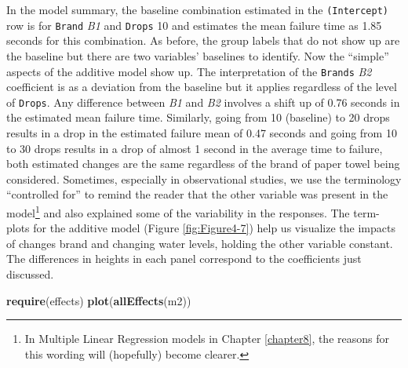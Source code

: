 \documentclass[]{book}
\newenvironment{Shaded}{\begin{snugshade}}{\end{snugshade}}
\newcommand{\KeywordTok}[1]{\textcolor[rgb]{0.13,0.29,0.53}{\textbf{#1}}}
\newcommand{\NormalTok}[1]{#1}
\let\rmarkdownfootnote\footnote%
\def\footnote{\protect\rmarkdownfootnote}
\theoremstyle{definition}
\theoremstyle{definition}
\theoremstyle{remark}
\begin{document}
In the model summary, the baseline combination estimated in the
\texttt{(Intercept)} row is for \texttt{Brand} \emph{B1} and
\texttt{Drops} 10 and estimates the mean failure time as 1.85 seconds
for this combination. As before, the group labels that do not show up
are the baseline but there are two variables' baselines to identify. Now
the ``simple'' aspects of the additive model show up. The interpretation
of the \texttt{Brands} \emph{B2} coefficient is as a deviation from the
baseline but it applies regardless of the level of \texttt{Drops}. Any
difference between \emph{B1} and \emph{B2} involves a shift up of 0.76
seconds in the estimated mean failure time. Similarly, going from 10
(baseline) to 20 drops results in a drop in the estimated failure mean
of 0.47 seconds and going from 10 to 30 drops results in a drop of
almost 1 second in the average time to failure, both estimated changes
are the same regardless of the brand of paper towel being considered.
Sometimes, especially in observational studies, we use the terminology
``controlled for'' to remind the reader that the other variable was
present in the model\footnote{In Multiple Linear Regression models in
  Chapter \ref{chapter8}, the reasons for this wording will (hopefully)
  become clearer.} and also explained some of the variability in the
responses. The term-plots for the additive model (Figure
\ref{fig:Figure4-7}) help us visualize the impacts of changes brand and
changing water levels, holding the other variable constant. The
differences in heights in each panel correspond to the coefficients just
discussed.





\begin{Shaded}
\begin{Highlighting}[]
\KeywordTok{require}\NormalTok{(effects)}
\KeywordTok{plot}\NormalTok{(}\KeywordTok{allEffects}\NormalTok{(m2))}
\end{Highlighting}
\end{Shaded}
\end{document}
